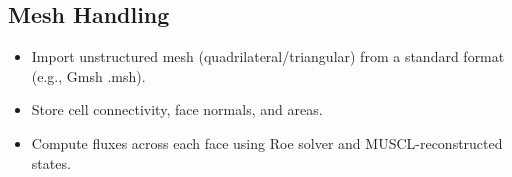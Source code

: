 \documentclass[a4paper,12pt]{article}
\begin{document}
\subsection*{Mesh Handling}
\begin{itemize}
    \item Import unstructured mesh (quadrilateral/triangular) from a standard format (e.g., Gmsh .msh).
    \item Store cell connectivity, face normals, and areas.
    \item Compute fluxes across each face using Roe solver and MUSCL-reconstructed states.
\end{itemize}
\end{document}
